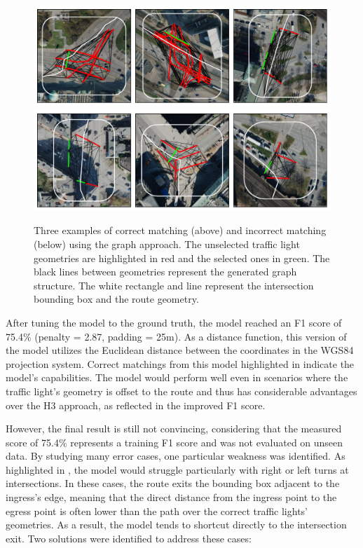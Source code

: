 \begin{figure}[t]
\centering
\includegraphics[width=\linewidth]{images/matching-dijkstra-correct.pdf} 
\\
\includegraphics[width=\linewidth]{images/matching-dijkstra-incorrect.pdf}
\caption{Three examples of correct matching (above) and incorrect matching (below) using the graph approach. The unselected traffic light geometries are highlighted in red and the selected ones in green. The black lines between geometries represent the generated graph structure. The white rectangle and line represent the intersection bounding box and the route geometry.}
\label{fig:sg-selection-graph-example}
\end{figure}

After tuning the model to the ground truth, the model reached an F1 score of 75.4\% (penalty = 2.87, padding = 25m). As a distance function, this version of the model utilizes the Euclidean distance between the coordinates in the WGS84 projection system. Correct matchings from this model highlighted in  indicate the model's capabilities. The model would perform well even in scenarios where the traffic light's geometry is offset to the route and thus has considerable advantages over the H3 approach, as reflected in the improved F1 score.

However, the final result is still not convincing, considering that the measured score of 75.4\% represents a training F1 score and was not evaluated on unseen data. By studying many error cases, one particular weakness was identified. As highlighted in , the model would struggle particularly with right or left turns at intersections. In these cases, the route exits the bounding box adjacent to the ingress's edge, meaning that the direct distance from the ingress point to the egress point is often lower than the path over the correct traffic lights' geometries. As a result, the model tends to shortcut directly to the intersection exit. Two solutions were identified to address these cases:

